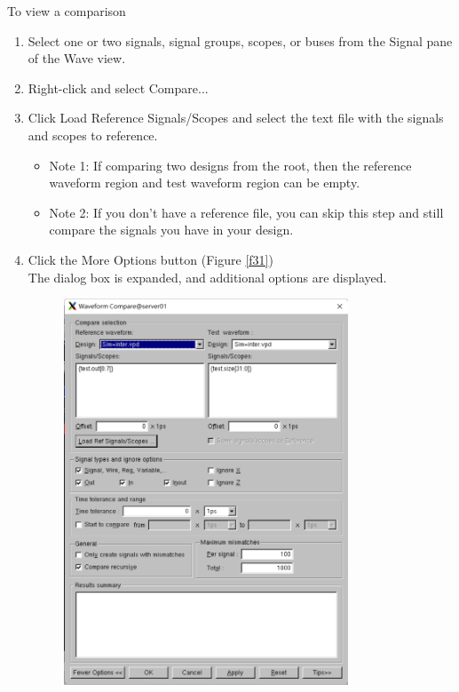 \documentclass[a4paper,12pt,twoside]{article}
\begin{document}
To view a comparison
\begin{enumerate}
    \item Select one or two signals, signal groups, scopes, or buses from the Signal pane of the Wave view.
    \item Right-click and select Compare...
    \item Click Load Reference Signals/Scopes and select the text file with the signals and scopes to reference.
    \begin{itemize}
        \item Note 1: If comparing two designs from the root, then the reference waveform region and test waveform region can be empty.
        \item Note 2: If you don't have a reference file, you can skip this step and still compare the signals you have in your design.
    \end{itemize}
    \item Click the More Options button (Figure \ref{f31})\\
    The dialog box is expanded, and additional options are displayed.
    \begin{figure}[H]
        \centering
        \includegraphics[width=0.8\textwidth]{images/31.png}

\end{figure}
\end{enumerate}
\end{document}
